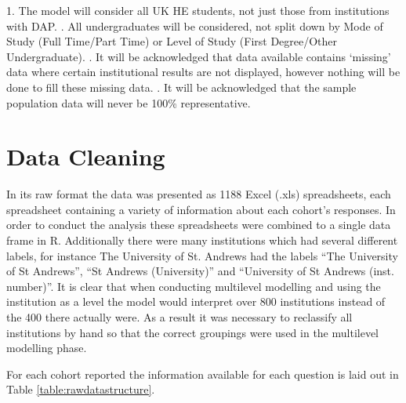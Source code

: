 \documentclass[11pt,a4paper]{report}
\begin{document}
1.	The model will consider all UK HE students, not just those from institutions with \ac{DAP}. .	All undergraduates will be considered, not split down by Mode of Study (Full Time/Part Time) or Level of Study (First Degree/Other Undergraduate). .	It will be acknowledged that data available contains ‘missing’ data where certain institutional results are not displayed, however nothing will be done to fill these missing data. . It will be acknowledged that the sample population data will never be 100\% representative. \newline

\newpage
\section{Data Cleaning} \label{Data Cleaning}
In its raw format the data was presented as 1188 Excel (.xls) spreadsheets, each spreadsheet containing a variety of information about each cohort's responses. In order to conduct the analysis these spreadsheets were combined to a single data frame in R. Additionally there were many institutions which had several different labels, for instance The University of St. Andrews had the labels “The University of St Andrews”, “St Andrews (University)” and “University of St Andrews (inst. number)”. It is clear that when conducting multilevel modelling and using the institution as a level the model would interpret over 800 institutions instead of the 400 there actually were.  As a result it was necessary to reclassify all institutions by hand so that the correct groupings were used in the multilevel modelling phase. 

For each cohort reported the information available for each question is laid out in Table \ref{table:rawdatastructure}.
\vspace{1.5cm}
\end{document}
